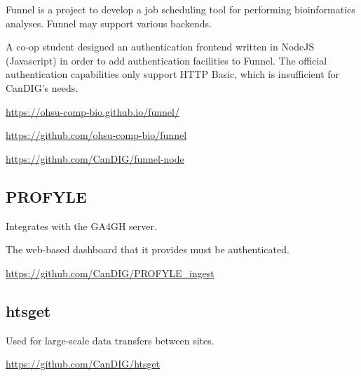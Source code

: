 \documentclass{article}
\begin{document}
Funnel is a project to develop a job scheduling tool for performing
bioinformatics analyses. Funnel may support various backends.

A co-op student designed an authentication frontend written in NodeJS (Javascript)  in order to add authentication facilities to Funnel. The official authentication capabilities only support HTTP Basic, which is insufficient for CanDIG's needs.

\url{https://ohsu-comp-bio.github.io/funnel/}

\url{https://github.com/ohsu-comp-bio/funnel}

\url{https://github.com/CanDIG/funnel-node}

\subsection{PROFYLE}

Integrates with the GA4GH server.

The web-based dashboard that it provides must be authenticated.

\url{https://github.com/CanDIG/PROFYLE_ingest}


\subsection{htsget}

Used for large-scale data transfers between sites.

\url{https://github.com/CanDIG/htsget}
\end{document}
